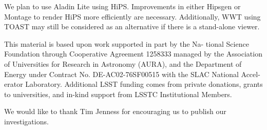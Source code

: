 \documentclass[11pt,twoside]{article}
\begin{document}
We plan to use Aladin Lite using HiPS. Improvements in either Hipsgen or Montage to render HiPS more efficiently are necessary. Additionally, WWT using TOAST may still be considered as an alternative if there is a stand-alone viewer.

\acknowledgements This material is based upon work supported in part by the Na- tional Science Foundation through Cooperative Agreement 1258333 managed by the Association of Universities for Research in Astronomy (AURA), and the Department of Energy under Contract No. DE-AC02-76SF00515 with the SLAC National Accel- erator Laboratory. Additional LSST funding comes from private donations, grants to universities, and in-kind support from LSSTC Institutional Members.

We would like to thank Tim Jenness for encouraging us to publish our investigations.

\end{document}
